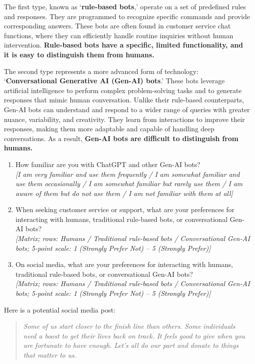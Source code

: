 \documentclass[12pt,notitlepage]{article}
\theoremstyle{plain}
\theoremstyle{plain}
\theoremstyle{definition}
\theoremstyle{definition}
\theoremstyle{assumption}
\theoremstyle{plain}
\theoremstyle{plain}
\theoremstyle{plain}
\theoremstyle{plain}
\theoremstyle{definition}%
\theoremstyle{plain}
\theoremstyle{plain}
\theoremstyle{plain}
\theoremstyle{plain}
\begin{document}
The first type, known as `\textbf{rule-based bots},' operate on a set of predefined rules and responses. They are programmed to recognize specific commands and provide corresponding answers. These bots are often found in customer service chat functions, where they can efficiently handle routine inquiries without human intervention. \textbf{Rule-based bots have a specific, limited functionality, and it is easy to distinguish them from humans.}

The second type represents a more advanced form of technology: `\textbf{Conversational Generative AI (Gen-AI) bots}.' These bots leverage artificial intelligence to perform complex problem-solving tasks and to generate responses that mimic human conversation. Unlike their rule-based counterparts, Gen-AI bots can understand and respond to a wider range of queries with greater nuance, variability, and creativity. They learn from interactions to improve their responses, making them more adaptable and capable of handling deep conversations. As a result, \textbf{Gen-AI bots are difficult to distinguish from humans.}

\begin{enumerate}
\item How familiar are you with ChatGPT and other Gen-AI bots?\\
\emph{[I am very familiar and use them frequently / I am somewhat familiar and use them occasionally / I am somewhat familiar but rarely use them / I am aware of them but do not use them / I am not familiar with them at all]}
\item When seeking customer service or support, what are your preferences for interacting with humans, traditional rule-based bots, or conversational Gen-AI bots?\\
\emph{[Matrix; rows: Humans / Traditional rule-based bots / Conversational Gen-AI bots; 5-point scale: 1 (Strongly Prefer Not) -- 5 (Strongly Prefer)]}
\item On social media, what are your preferences for interacting with humans, traditional rule-based bots, or conversational Gen-AI bots?\\
\emph{[Matrix; rows: Humans / Traditional rule-based bots / Conversational Gen-AI bots; 5-point scale: 1 (Strongly Prefer Not) -- 5 (Strongly Prefer)]}
\end{enumerate}

Here is a potential social media post:

\begin{quote}
\emph{Some of us start closer to the finish line than others. Some individuals need a boost to get their lives back on track. It feels good to give when you are fortunate to have enough. Let's all do our part and donate to things that matter to us.}
\end{quote}
\end{document}
